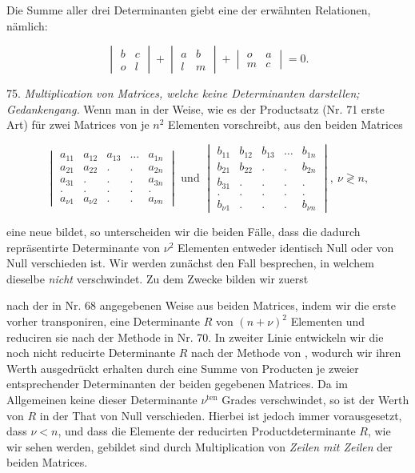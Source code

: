 Die Summe aller drei Determinanten giebt eine der erwähnten Relationen, nämlich:

\[
\begin{vmatrix} b & c\\ o & l\end{vmatrix} + \begin{vmatrix} a & b\\ l & m\end{vmatrix} + \begin{vmatrix} o & a\\ m & c\end{vmatrix} = 0.
\]

75. \textit{Multiplication von Matrices, welche keine Determinanten darstellen; Gedankengang.} Wenn man in der Weise, wie es der Productsatz (Nr. 71 erste Art) für zwei Matrices von je $n^2$ Elementen vorschreibt, aus den beiden Matrices

\[
\begin{vmatrix}
a_{11} & a_{12} & a_{13} & \ldots & a_{1n}\\
a_{21} & a_{22} & . & . & a_{2n}\\
a_{31} & . & . & . & a_{3n}\\
. & . & . & . & .\\
a_{\nu 1} & a_{\nu 2} & . & . & a_{\nu n}
\end{vmatrix}
\text{ und }
\begin{vmatrix}
b_{11} & b_{12} & b_{13} & \ldots & b_{1n}\\
b_{21} & b_{22} & . & . & b_{2n}\\
b_{31} & . & . & . & .\\
. & . & . & . & .\\
b_{\nu 1} & . & . & . & b_{\nu n}
\end{vmatrix},\ \nu \gtrless n,
\]

eine neue bildet, so unterscheiden wir die beiden Fälle, dass die dadurch repräsentirte Determinante von $\nu^2$ Elementen entweder identisch Null oder von Null verschieden ist. Wir werden zunächst den Fall besprechen, in welchem dieselbe \textit{nicht} verschwindet. Zu dem Zwecke bilden wir zuerst



nach der in Nr. 68 angegebenen Weise aus beiden Matrices, indem wir die erste vorher transponiren, eine Determinante $R$ von $(n+\nu)^2$ Elementen und reduciren sie nach der Methode in Nr. 70. In zweiter Linie entwickeln wir die noch nicht reducirte Determinante $R$ nach der Methode von , wodurch wir ihren Werth ausgedrückt erhalten durch eine Summe von Producten je zweier entsprechender Determinanten der beiden gegebenen Matrices. Da im Allgemeinen keine dieser Determinante $\nu^{\mathrm{ten}}$ Grades verschwindet, so ist der Werth von $R$ in der That von Null verschieden. Hierbei ist jedoch immer vorausgesetzt, dass $\nu < n$, und dass die Elemente der reducirten Productdeterminante $R$, wie wir sehen werden, gebildet sind durch Multiplication von \textit{Zeilen mit Zeilen} der beiden Matrices.

